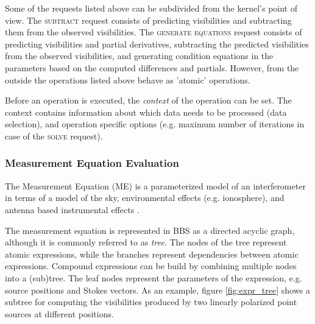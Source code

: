 \documentclass[10pt]{lofar}
\newcommand{\bbs}{BBS\xspace}
\newcommand{\me}{ME\xspace}
\newcommand{\subtract}{\textsc{subtract}\xspace}
\newcommand{\solve}{\textsc{solve}\xspace}
\newcommand{\generate}{\textsc{generate equations}\xspace}
\begin{document}
Some of the requests listed above can be subdivided from the kernel's point of
view. The \subtract request consists of predicting visibilities and subtracting
them from the observed visibilities. The \generate request consists of
predicting visibilities and partial derivatives, subtracting the predicted
visibilities from the observed visibilities, and generating condition equations
in the parameters based on the computed differences and partials. However, from
the outside the operations listed above behave as 'atomic' operations.

Before an operation is executed, the \emph{context} of the operation can be set.
The context contains information about which data needs to be processed (data
selection), and operation specific options (e.g. maximum number of iterations in
case of the \solve request).

\subsubsection{Measurement Equation Evaluation}
\label{subsubsec:design-me-evaluation}

The Measurement Equation (\me) \cite{LOFAR-ASTRON-ADD-015} is a parameterized
model of an interferometer in terms of a model of the sky, environmental effects
(e.g. ionosphere), and antenna based instrumental effects \cite{Hamaker1995,
aips++note185}.

The measurement equation is represented in \bbs as a directed acyclic graph,
although it is commonly referred to as \emph{tree}. The nodes of the tree
represent atomic expressions, while the branches represent dependencies between
atomic expressions. Compound expressions can be build by combining multiple
nodes into a (sub)tree. The leaf nodes represent the parameters of the
expression, e.g. source positions and Stokes vectors. As an example, figure
\ref{fig:expr_tree} shows a subtree for computing the visibilities produced by
two linearly polarized point sources at different positions.
\end{document}
